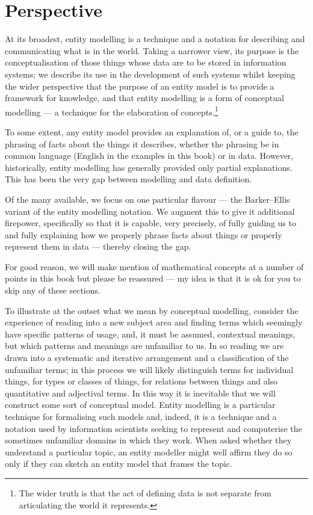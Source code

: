 

\section{Perspective}

\label{Perspective}


At its broadest, entity modelling is a technique and a notation for describing and communicating what is in the world. Taking a narrower view, its purpose is the conceptualisation of those things whose data are to be stored in information systems; we describe its use in the development of such systems whilst keeping the wider perspective that the purpose of an entity model is to provide a framework for knowledge, and that entity modelling is a form of conceptual modelling — a technique for the elaboration of concepts.\footnote{The wider truth is that the act of defining data is not separate from articulating the world it represents.}



To some extent, any entity model provides an explanation of, or a guide to, the phrasing of facts about the things it describes, whether the phrasing be in common language (English in the examples in this book) or in data. However, historically, entity modelling has generally provided only partial explanations. This has been the very gap between modelling and data definition.

Of the many available, we focus on one particular flavour — the Barker–Ellis variant of the entity modelling notation. We augment this to give it additional firepower, specifically so that it is capable, very precisely, of fully guiding us to and fully explaining how we properly phrase facts about things or properly represent them in data — thereby closing the gap.



For good reason, we will make mention of mathematical concepts at a number of points in this book
but please be reassured --- my idea is that it is ok for you to skip any of these sections. 

To illustrate at the outset what we mean by conceptual modelling, consider the experience of reading into a new subject area and finding terms which seemingly have specific patterns of usage, and, it must be assumed, contextual meanings, but which patterns and meanings are unfamiliar to us. In so reading we are drawn into a systematic and iterative arrangement and a classification of the unfamiliar terms; in this process we will likely distinguish terms for individual things, for types or classes of things, for relations between things and also quantitative and adjectival terms. In this way it is inevitable that we will construct some sort of conceptual model. 
Entity modelling is a particular technique for formalising such models and, indeed, it is a technique and a notation used by information scientists seeking to represent and computerise the sometimes unfamiliar domains in which they work. When asked whether they understand a particular topic, an entity modeller might well affirm they do so only if they can sketch an entity model that frames the topic.

